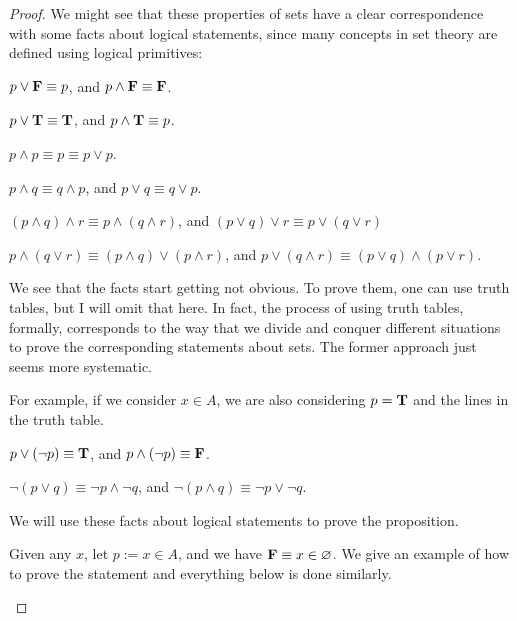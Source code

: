 \begin{proof}
	We might see that these properties of sets have a clear correspondence with some facts about logical statements, since many concepts in set theory are defined using logical primitives:
	\begin{enumabc}
		\item $p \vee \mathbf{F} \equiv p$, and $p \wedge \mathbf{F} \equiv \mathbf{F}$.
		
		\item $p \vee \mathbf{T} \equiv \mathbf{T}$, and $p \wedge \mathbf{T} \equiv p$.
		
		\item $p \wedge p \equiv p \equiv p \vee p$.
		
		\item $p \wedge q \equiv q \wedge p$, and $p \vee q \equiv q \vee p$.
		
		\item $(p \wedge q) \wedge r \equiv p \wedge (q \wedge r)$, and $(p \vee q) \vee r \equiv p \vee (q \vee r)$
		
		\item $p \wedge (q \vee r) \equiv (p \wedge q) \vee (p \wedge r)$, and $p \vee (q \wedge r) \equiv (p \vee q) \wedge (p \vee r)$.
		
		We see that the facts start getting not obvious. To prove them, one can use truth tables, but I will omit that here. In fact, the process of using truth tables, formally, corresponds to the way that we divide and conquer different situations to prove the corresponding statements about sets. The former approach just seems more systematic.
		
		For example, if we consider $x \in A$, we are also considering $p = \mathbf{T}$ and the lines in the truth table.
		
		\item $p \vee (\neg p) \equiv \mathbf{T}$, and $p \wedge (\neg p) \equiv \mathbf{F}$.
		
		\item $\neg(p \vee q) \equiv \neg p \wedge \neg q$, and $\neg (p \wedge q) \equiv \neg p \vee \neg q$.
	\end{enumabc}

	We will use these facts about logical statements to prove the proposition.
	\begin{enumabc}
		\item Given any $x$, let $p := x \in A$, and we have $\mathbf{F} \equiv x \in \varnothing$. We give an example of how to prove the statement and everything below is done similarly.
		

\end{enumabc}
\end{proof}
